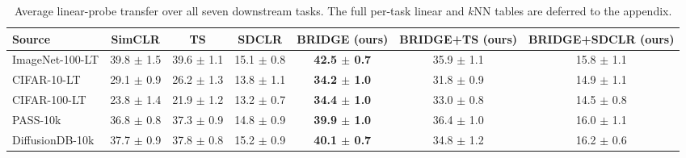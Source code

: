 \begin{table}[t]
\centering
\scriptsize
\setlength{\tabcolsep}{3.5pt}
\caption{Average linear-probe transfer over all seven downstream tasks. The full per-task linear and $k$NN tables are deferred to the appendix.}
\label{tab:main_sota_average}
\begin{adjustbox}{max width=\textwidth}
\begin{tabular}{l c c c c c c}
\toprule
Source & SimCLR & TS & SDCLR & BRIDGE (ours) & BRIDGE+TS (ours) & BRIDGE+SDCLR (ours) \\
\midrule
ImageNet-100-LT & 39.8 {\scriptsize$\pm$ 1.5} & 39.6 {\scriptsize$\pm$ 1.1} & 15.1 {\scriptsize$\pm$ 0.8} & \textbf{42.5 {\scriptsize$\pm$ 0.7}} & 35.9 {\scriptsize$\pm$ 1.1} & 15.8 {\scriptsize$\pm$ 1.1} \\
CIFAR-10-LT & 29.1 {\scriptsize$\pm$ 0.9} & 26.2 {\scriptsize$\pm$ 1.3} & 13.8 {\scriptsize$\pm$ 1.1} & \textbf{34.2 {\scriptsize$\pm$ 1.0}} & 31.8 {\scriptsize$\pm$ 0.9} & 14.9 {\scriptsize$\pm$ 1.1} \\
CIFAR-100-LT & 23.8 {\scriptsize$\pm$ 1.4} & 21.9 {\scriptsize$\pm$ 1.2} & 13.2 {\scriptsize$\pm$ 0.7} & \textbf{34.4 {\scriptsize$\pm$ 1.0}} & 33.0 {\scriptsize$\pm$ 0.8} & 14.5 {\scriptsize$\pm$ 0.8} \\
PASS-10k & 36.8 {\scriptsize$\pm$ 0.8} & 37.3 {\scriptsize$\pm$ 0.9} & 14.8 {\scriptsize$\pm$ 0.9} & \textbf{39.9 {\scriptsize$\pm$ 1.0}} & 36.4 {\scriptsize$\pm$ 1.0} & 16.0 {\scriptsize$\pm$ 1.1} \\
DiffusionDB-10k & 37.7 {\scriptsize$\pm$ 0.9} & 37.8 {\scriptsize$\pm$ 0.8} & 15.2 {\scriptsize$\pm$ 0.9} & \textbf{40.1 {\scriptsize$\pm$ 0.7}} & 34.8 {\scriptsize$\pm$ 1.2} & 16.2 {\scriptsize$\pm$ 0.6} \\
\bottomrule
\end{tabular}
\end{adjustbox}
\end{table}
